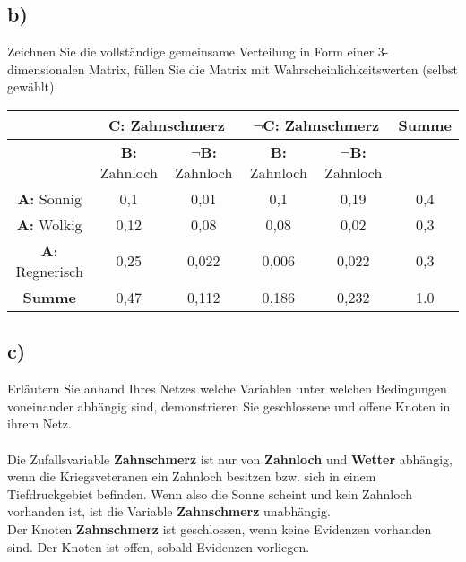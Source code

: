 \documentclass[12pt, a4paper]{article}
\begin{document}
\subsection*{b)}
Zeichnen Sie die vollständige gemeinsame Verteilung in Form einer 3-dimensionalen Matrix, füllen Sie die Matrix mit Wahrscheinlichkeitswerten (selbst gewählt).
\\
\hspace{-0.5cm}
\begin{flushleft}
\begin{tabular}[bct]{|c|c|c|c|c|c|}
\hline \bigstrut
& \multicolumn{2}{|c|}{\textbf{C:} Zahnschmerz } & \multicolumn{2}{|c|}{\textbf{$\neg$C}: Zahnschmerz } & \textbf{Summe} \\
\hline \bigstrut
& \textbf{B:} Zahnloch & \textbf{$\neg$B:} Zahnloch & \textbf{B:} Zahnloch & \textbf{$\neg$B:} Zahnloch & \\
\hline \bigstrut
\textbf{A:} Sonnig & 0,1 & 0,01 & 0,1 & 0,19 & 0,4 \\ 
\hline \bigstrut
\textbf{A:} Wolkig & 0,12 & 0,08 & 0,08 & 0,02 & 0,3 \\ 
\hline \bigstrut
\textbf{A:} Regnerisch & 0,25 & 0,022 & 0,006 & 0,022 & 0,3 \\ 
\hline \bigstrut
\textbf{Summe} & 0,47 & 0,112 & 0,186 & 0,232 & 1.0 \\ 
\hline
\end{tabular}
\end{flushleft}


\subsection*{c)}
Erläutern Sie anhand Ihres Netzes welche Variablen unter welchen Bedingungen voneinander abhängig sind, demonstrieren Sie geschlossene und offene Knoten in ihrem Netz.
\\\\
Die Zufallsvariable \textbf{Zahnschmerz} ist nur von \textbf{Zahnloch} und \textbf{Wetter} abhängig, wenn die Kriegsveteranen ein Zahnloch besitzen bzw. sich in einem Tiefdruckgebiet befinden. Wenn also die Sonne scheint und kein Zahnloch vorhanden ist, ist die Variable \textbf{Zahnschmerz} unabhängig.\\
Der Knoten \textbf{Zahnschmerz} ist geschlossen, wenn keine Evidenzen vorhanden sind. Der Knoten ist offen, sobald Evidenzen vorliegen.
\end{document}
